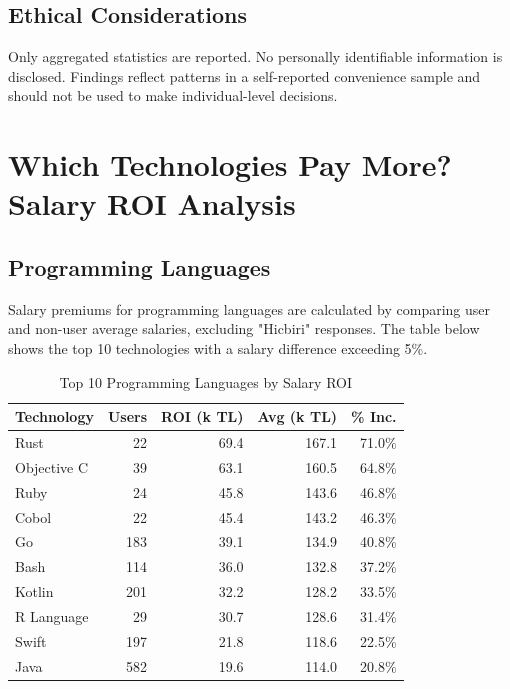 \documentclass[12pt,a4paper]{article}
\begin{document}
\subsection{Ethical Considerations}
Only aggregated statistics are reported. No personally identifiable information is disclosed. Findings reflect patterns in a self-reported convenience sample and should not be used to make individual-level decisions.

\section{Which Technologies Pay More? Salary ROI Analysis}

\subsection{Programming Languages}
Salary premiums for programming languages are calculated by comparing user and non-user average salaries, excluding "Hicbiri" responses. The table below shows the top 10 technologies with a salary difference exceeding 5\%.

\begin{table}[H]
	\centering
	\small
	\begin{tabular}{lrrrr}
		\toprule
		\textbf{Technology} & \textbf{Users} & \textbf{ROI (k TL)} & \textbf{Avg (k TL)} & \textbf{\% Inc.} \\
		\midrule
		Rust                & 22             & 69.4                & 167.1               & 71.0\%           \\
		Objective C         & 39             & 63.1                & 160.5               & 64.8\%           \\
		Ruby                & 24             & 45.8                & 143.6               & 46.8\%           \\
		Cobol               & 22             & 45.4                & 143.2               & 46.3\%           \\
		Go                  & 183            & 39.1                & 134.9               & 40.8\%           \\
		Bash                & 114            & 36.0                & 132.8               & 37.2\%           \\
		Kotlin              & 201            & 32.2                & 128.2               & 33.5\%           \\
		R Language          & 29             & 30.7                & 128.6               & 31.4\%           \\
		Swift               & 197            & 21.8                & 118.6               & 22.5\%           \\
		Java                & 582            & 19.6                & 114.0               & 20.8\%           \\
		\bottomrule
	\end{tabular}
	\caption{Top 10 Programming Languages by Salary ROI}
\end{table}
\end{document}
